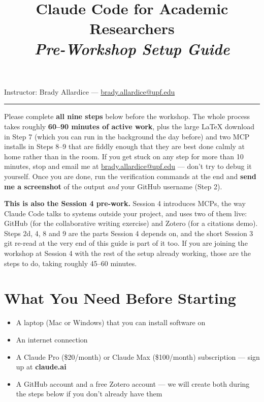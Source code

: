 \documentclass[11pt]{article}
\title{\vspace{-2em}\Huge\bfseries Claude Code for Academic Researchers\\[0.3em]\Large\mdseries\itshape Pre-Workshop Setup Guide}
\author{}
\date{}
\begin{document}
\maketitle
\vspace{-2em}
\begin{center}
Instructor: Brady Allardice --- \href{mailto:brady.allardice@upf.edu}{brady.allardice@upf.edu}
\end{center}

\hrule
\vspace{0.8em}

Please complete \textbf{all nine steps} below before the workshop. The whole process takes roughly \textbf{60--90 minutes of active work}, plus the large \LaTeX{} download in Step 7 (which you can run in the background the day before) and two MCP installs in Steps 8--9 that are fiddly enough that they are best done calmly at home rather than in the room. If you get stuck on any step for more than 10 minutes, stop and email me at \href{mailto:brady.allardice@upf.edu}{brady.allardice@upf.edu} --- don't try to debug it yourself. Once you are done, run the verification commands at the end and \textbf{send me a screenshot} of the output \emph{and} your GitHub username (Step 2).

\textbf{This is also the Session 4 pre-work.} Session 4 introduces MCPs, the way Claude Code talks to systems outside your project, and uses two of them live: GitHub (for the collaborative writing exercise) and Zotero (for a citations demo). Steps 2d, 4, 8 and 9 are the parts Session 4 depends on, and the short Session 3 git re-read at the very end of this guide is part of it too. If you are joining the workshop at Session 4 with the rest of the setup already working, those are the steps to do, taking roughly 45--60 minutes.

\section*{What You Need Before Starting}
\begin{itemize}[leftmargin=2em,itemsep=0pt]
  \item A laptop (Mac or Windows) that you can install software on
  \item An internet connection
  \item A Claude Pro (\$20/month) or Claude Max (\$100/month) subscription --- sign up at \textbf{claude.ai}
  \item A GitHub account and a free Zotero account --- we will create both during the steps below if you don't already have them
\end{itemize}
\end{document}
